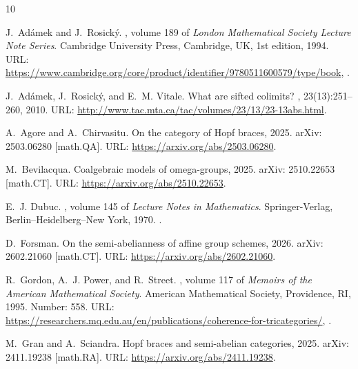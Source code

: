 \documentclass[11pt]{article}
\theoremstyle{plain}
\theoremstyle{definition}
\numberwithin{equation}{section}
\begin{document}
{\footnotesize
\begin{thebibliography}{10}

J.~Adámek and J.~Rosický.
, volume 189 of {\em London {Mathematical} {Society} {Lecture} {Note} {Series}}.
\newblock Cambridge University Press, Cambridge, UK, 1st edition, 1994.
\newblock URL: \url{https://www.cambridge.org/core/product/identifier/9780511600579/type/book}, \href {https://doi.org/10.1017/CBO9780511600579} {}.

J.~Adámek, J.~Rosický, and E.~M. Vitale.
\newblock What are sifted colimits?
, 23(13):251--260, 2010.
\newblock URL: \url{http://www.tac.mta.ca/tac/volumes/23/13/23-13abs.html}.

A.~Agore and A.~Chirvasitu.
\newblock On the category of {Hopf} braces, 2025.
\newblock arXiv: 2503.06280 [math.QA].
\newblock URL: \url{https://arxiv.org/abs/2503.06280}.

M.~Bevilacqua.
\newblock Coalgebraic models of omega-groups, 2025.
\newblock arXiv: 2510.22653 [math.CT].
\newblock URL: \url{https://arxiv.org/abs/2510.22653}.

E.~J. Dubuc.
, volume 145 of {\em Lecture {Notes} in {Mathematics}}.
\newblock Springer-Verlag, Berlin–Heidelberg–New York, 1970.
\newblock \href {https://doi.org/10.1007/BFb0060485} {}.

D.~Forsman.
\newblock On the semi-abelianness of affine group schemes, 2026.
\newblock arXiv: 2602.21060 [math.CT].
\newblock URL: \url{https://arxiv.org/abs/2602.21060}.

R.~Gordon, A.~J. Power, and R.~Street.
, volume 117 of {\em Memoirs of the {American} {Mathematical} {Society}}.
\newblock American Mathematical Society, Providence, RI, 1995.
\newblock Number: 558.
\newblock URL: \url{https://researchers.mq.edu.au/en/publications/coherence-for-tricategories/}, \href {https://doi.org/10.1090/memo/0558} {}.

M.~Gran and A.~Sciandra.
\newblock Hopf braces and semi-abelian categories, 2025.
\newblock arXiv: 2411.19238 [math.RA].
\newblock URL: \url{https://arxiv.org/abs/2411.19238}.


\end{thebibliography}}
\end{document}
